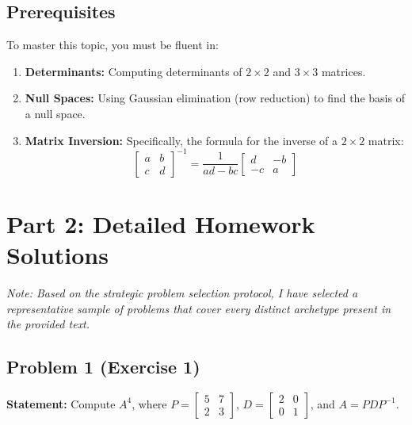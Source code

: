 \documentclass[11pt, a4paper]{article}
\theoremstyle{definition}
\theoremstyle{remark}
\begin{document}
\subsection{Prerequisites}
To master this topic, you must be fluent in:
\begin{enumerate}
    \item \textbf{Determinants:} Computing determinants of $2 \times 2$ and $3 \times 3$ matrices.
    \item \textbf{Null Spaces:} Using Gaussian elimination (row reduction) to find the basis of a null space.
    \item \textbf{Matrix Inversion:} Specifically, the formula for the inverse of a $2 \times 2$ matrix: 
    \[ \begin{bmatrix} a & b \\ c & d \end{bmatrix}^{-1} = \frac{1}{ad-bc} \begin{bmatrix} d & -b \\ -c & a \end{bmatrix} \]
\end{enumerate}

\newpage
\section{Part 2: Detailed Homework Solutions}
\textit{Note: Based on the strategic problem selection protocol, I have selected a representative sample of problems that cover every distinct archetype present in the provided text.}

\subsection{Problem 1 (Exercise 1)}
\textbf{Statement:} Compute $A^4$, where $P = \begin{bmatrix} 5 & 7 \\ 2 & 3 \end{bmatrix}$, $D = \begin{bmatrix} 2 & 0 \\ 0 & 1 \end{bmatrix}$, and $A = PDP^{-1}$.
\end{document}
